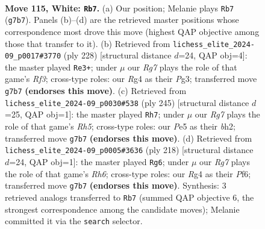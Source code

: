 \documentclass[11pt]{article}
\begin{document}
\clearpage

\begin{figure}[p]\centering
\begin{subfigure}{0.46\textwidth}\centering
\resizebox{\linewidth}{!}{%
\newchessgame
\chessboard[
  setfen={3k4/6R1/4p3/4P3/5PR1/8/5K2/7r w - - 15 115},
  showmover=false,
  pgfstyle=straightmove, color=movearrow, markmove={g7-b7}
]}
\caption{}
\end{subfigure}\hfill
\begin{subfigure}{0.46\textwidth}\centering
\resizebox{\linewidth}{!}{%
\newchessgame
\chessboard[
  setfen={8/r7/4k1p1/7p/7P/5RP1/8/6K1 w - - 66 115},
  showmover=false,
  pgfstyle=straightmove, color=movearrow, markmove={f3-e3}
]}
\caption{}
\end{subfigure}
\\[4pt]
\begin{subfigure}{0.46\textwidth}\centering
\resizebox{\linewidth}{!}{%
\newchessgame
\chessboard[
  setfen={8/8/8/8/2k4r/5K1p/7B/3R4 b - - 37 123},
  showmover=false,
  pgfstyle=straightmove, color=movearrow, markmove={h4-h7}
]}
\caption{}
\end{subfigure}\hfill
\begin{subfigure}{0.46\textwidth}\centering
\resizebox{\linewidth}{!}{%
\newchessgame
\chessboard[
  setfen={8/1r6/5P1R/6p1/6P1/6k1/8/4K3 w - - 0 110},
  showmover=false,
  pgfstyle=straightmove, color=movearrow, markmove={h6-g6}
]}
\caption{}
\end{subfigure}
\caption{\textbf{Move 115, White: \texttt{Rb7}.} (a) Our position; Melanie plays \texttt{Rb7} (\texttt{g7b7}). Panels (b)--(d) are the retrieved master positions whose correspondence most drove this move (highest QAP objective among those that transfer to it). (b) Retrieved from \texttt{lichess\_elite\_2024-09\_p0017\#3770} (ply 228) [structural distance $d$=24, QAP obj=4]: the master played \texttt{Re3+}; under $\mu$ our \emph{Rg7} plays the role of that game's \emph{Rf3}; cross-type roles: our \emph{R}g4 as their \emph{P}g3; transferred move \texttt{g7b7} \textbf{(endorses this move)}. (c) Retrieved from \texttt{lichess\_elite\_2024-09\_p0030\#538} (ply 245) [structural distance $d$=25, QAP obj=1]: the master played \texttt{Rh7}; under $\mu$ our \emph{Rg7} plays the role of that game's \emph{Rh5}; cross-type roles: our \emph{P}e5 as their \emph{b}h2; transferred move \texttt{g7b7} \textbf{(endorses this move)}. (d) Retrieved from \texttt{lichess\_elite\_2024-09\_p0005\#3636} (ply 218) [structural distance $d$=24, QAP obj=1]: the master played \texttt{Rg6}; under $\mu$ our \emph{Rg7} plays the role of that game's \emph{Rh6}; cross-type roles: our \emph{R}g4 as their \emph{P}f6; transferred move \texttt{g7b7} \textbf{(endorses this move)}. Synthesis: 3 retrieved analogs transferred to \texttt{Rb7} (summed QAP objective 6, the strongest correspondence among the candidate moves); Melanie committed it via the \texttt{search} selector.}
\label{fig:thought-m228}
\end{figure}
\end{document}
